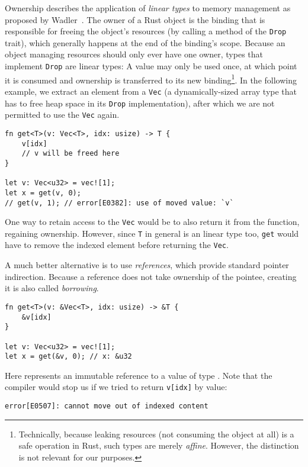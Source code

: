 Ownership describes the application of \emph{linear types} to memory management
as proposed by Wadler~\cite{wadler1990linear}. The owner of a Rust object is the binding that is responsible for freeing the
object's resources (by calling a method of the \texttt{Drop} trait), which
generally happens at the end of the binding's scope.
Because an object managing resources should only ever have one owner, types that implement
\texttt{Drop} are linear types: A value may only be used once, at which point it is
consumed and ownership is transferred to its new binding\footnote{Technically,
  because leaking resources (\ie not consuming the object at all) is a safe operation in Rust, such types are merely
  \emph{affine}. However, the distinction is not relevant for our purposes.
}. In the following example, we extract an element from a \texttt{Vec} (a dynamically-sized array
type that has to free heap space in its \texttt{Drop} implementation), after which we are not permitted to use the \texttt{Vec} again.

\begin{verbatim}
fn get<T>(v: Vec<T>, idx: usize) -> T {
    v[idx]
    // v will be freed here
}

let v: Vec<u32> = vec![1];
let x = get(v, 0);
// get(v, 1); // error[E0382]: use of moved value: `v`
\end{verbatim}

One way to retain access to the \texttt{Vec} would be to also return it from the
function, regaining ownership. However, since \texttt{T} in general is an linear
type too, \texttt{get} would have to remove the indexed element before returning
the \texttt{Vec}.

A much better alternative is to use \emph{references}, which provide standard
pointer indirection. Because a reference does not take ownership of the pointee,
creating it is also called \emph{borrowing}.

\begin{verbatim}
fn get<T>(v: &Vec<T>, idx: usize) -> &T {
    &v[idx]
}

let v: Vec<u32> = vec![1];
let x = get(&v, 0); // x: &u32
\end{verbatim}

Here  represents an immutable reference to a value of type . Note that the compiler would stop us if we tried to return \texttt{v[idx]} by value:

\begin{verbatim}
error[E0507]: cannot move out of indexed content
\end{verbatim}

